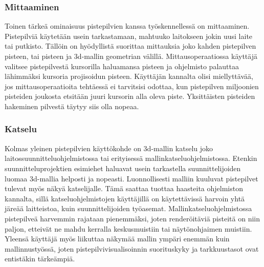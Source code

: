 \subsubsection{Mittaaminen}
Toinen tärkeä ominaisuus pistepilvien kanssa työskennellessä on mittaaminen. Pistepilviä käytetään usein tarkastamaan, mahtuuko laitokseen jokin uusi laite tai putkisto. Tällöin on hyödyllistä suorittaa mittauksia joko kahden pistepilven pisteen, tai pisteen ja 3d-mallin geometrian välillä. Mittausoperaatiossa käyttäjä valitsee pistepilvestä kursorilla haluamansa pisteen ja ohjelmisto palauttaa lähimmäksi kursoria projisoidun pisteen. Käyttäjän kannalta olisi miellyttävää, jos mittausoperaatioita tehtäessä ei tarvitsisi odottaa, kun pistepilven miljoonien pisteiden joukosta etsitään juuri kursorin alla oleva piste. Yksittäisten pisteiden hakeminen pilvestä täytyy siis olla nopeaa.

\subsubsection{Katselu}
Kolmas yleinen pistepilvien käyttökohde on 3d-mallin katselu joko laitossuunnitteluohjelmistossa tai erityisessä mallinkatseluohjelmistossa. Etenkin suunnitteluprojektien esimiehet haluavat usein tarkastella suunnittelijoiden luomaa 3d-mallia helposti ja nopeasti. Luonnollisesti malliin kuuluvat pistepilvet tulevat myös näkyä katselijalle. Tämä saattaa tuottaa haasteita ohjelmiston kannalta, sillä katseluohjelmistojen käyttäjillä on käytettävissä harvoin yhtä järeää laitteistoa, kuin suunnittelijoiden työasemat. Mallinkatseluohjelmistossa pistepilveä harvemmin rajataan pienemmäksi, joten renderöitäviä pisteitä on niin paljon, etteivät ne mahdu kerralla keskusmuistiin tai näytönohjaimen muistiin. Yleensä käyttäjä myös liikuttaa näkymää mallin ympäri enemmän kuin mallinnustyössä, joten pistepilvivisualisoinnin suorituskyky ja tarkkuustasot ovat entistäkin tärkeämpiä.

